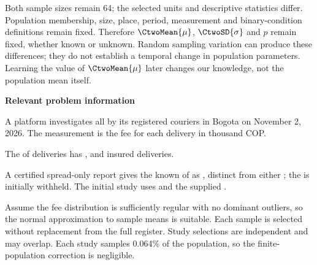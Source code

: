 Both sample sizes remain 64; the selected units and descriptive statistics differ. Population membership, size, place, period, measurement and binary-condition definitions remain fixed. Therefore $\CtwoMean{\mu}$, $\CtwoSD{\sigma}$ and $p$ remain fixed, whether known or unknown. Random sampling variation can produce these differences; they do not establish a temporal change in population parameters. Learning the value of $\CtwoMean{\mu}$ later changes our knowledge, not the population mean itself.

\secInicio[][sec:p3]

\clearpage



\textbf{Relevant problem information}

\begin{probleminfoexcerpt}
A platform investigates all    by its registered couriers in Bogota on November 2, 2026. The measurement is the fee for each delivery in thousand COP.
\end{probleminfoexcerpt}

\begin{probleminfoexcerpt}
The     of  deliveries has     ,       and  insured deliveries.
\end{probleminfoexcerpt}

\begin{probleminfoexcerpt}
A certified spread-only report gives the known    of  as   , distinct from either   ; the   is initially withheld. The initial study uses   and the supplied      .
\end{probleminfoexcerpt}

\begin{probleminfoexcerpt}
Assume the fee distribution is sufficiently regular with no dominant outliers, so the normal approximation to sample means is suitable. Each sample is selected without replacement from the full register. Study selections are independent and may overlap. Each study samples 0.064\% of the population, so the finite-population correction is negligible.
\end{probleminfoexcerpt}

